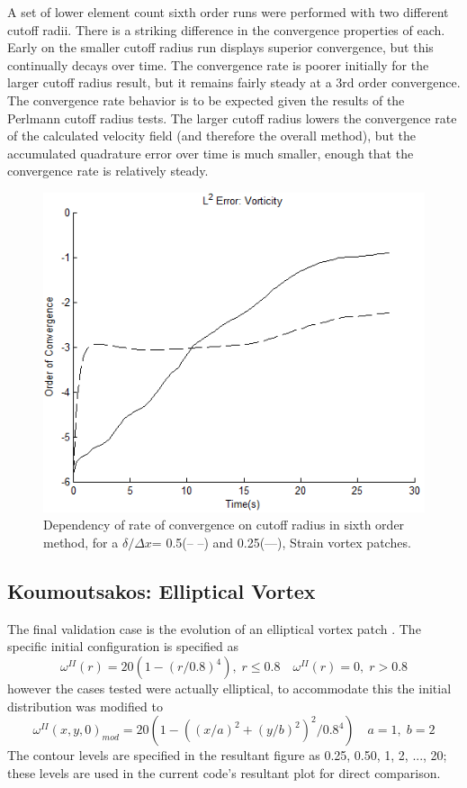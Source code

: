 \documentclass[]{aiaa-tc}%
\newcommand{\be}{\begin{equation}}
\newcommand{\ben}[1]{\begin{equation}\label{#1}}
\newcommand{\ee}{\end{equation}}
\begin{document}
A set of lower element count sixth order runs were performed with two different cutoff radii. There is a striking difference in the convergence properties of each. Early on the smaller cutoff radius run displays superior convergence, but this continually decays over time. The convergence rate is poorer initially for the larger cutoff radius result, but it remains fairly steady at a 3rd order convergence. The convergence rate behavior is to be expected given the results of the Perlmann cutoff radius tests. The larger cutoff radius lowers the convergence rate of the calculated velocity field (and therefore the overall method), but the accumulated quadrature error over time is much smaller, enough that the convergence rate is relatively steady.

\begin{figure}
\centering
\includegraphics[width=.5\textwidth]{Strain6vs6R.PNG}
\caption{\label{fig:Strain6vs6}Dependency of rate of convergence on cutoff radius in sixth order method, for a $\delta/\Delta x$= 0.5(--{ }--) and 0.25(---), Strain vortex patches. }
\end{figure}

\subsection{Koumoutsakos: Elliptical Vortex}
The final validation case is the evolution of an elliptical vortex patch \cite{Koum1997}. The specific initial configuration is specified as
\be \omega^{II}(r) = 20(1-(r/0.8)^4), \; r\leq 0.8 \quad \omega^{II}(r)=0, \; r>0.8 \ee
however the cases tested were actually elliptical, to accommodate this the initial distribution was modified to
\ben{KoumEqn} \omega^{II}(x,y,0)_{mod} = 20(1-((x/a)^2+(y/b)^2)^2/0.8^4 ) \quad a=1, \; b=2 \ee
The contour levels are specified in the resultant figure as 0.25, 0.50, 1, 2, ..., 20; these levels are used in the current code's resultant plot for direct comparison.
\end{document}
